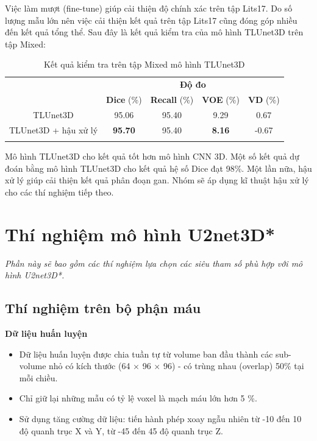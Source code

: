 Việc làm mượt (fine-tune) giúp cải thiện độ chính xác trên tập Lits17. Do số lượng mẫu lớn nên việc cải thiện kết quả trên tập Lits17 cũng đóng góp nhiều đến kết quả tổng thể. Sau đây là kết quả kiểm tra của mô hình TLUnet3D trên tập Mixed:

\begin{table}[H]
\renewcommand{\arraystretch}{1.1}
\centering
\begin{tabular}{c|c|c|c|c}
\Xhline{3\arrayrulewidth}
\multirow{2}{*}{\textbf{Thí nghiệm}} & \multicolumn{4}{c}{\textbf{Độ đo}}                             \\ \cline{2-5} 
                                     & \textbf{Dice} (\%) & \textbf{Recall} (\%) & \textbf{VOE} (\%) & \textbf{VD} (\%) \\ \hline
TLUnet3D                            & 95.06     & 95.40     & 9.29     & 0.67    \\ \hline
TLUnet3D + hậu xử lý             & \textbf{95.70}       & 95.40     & \textbf{8.16}   & -0.67       \\ 
\Xhline{3\arrayrulewidth}
\end{tabular}
\caption{Kết quả kiểm tra trên tập Mixed mô hình TLUnet3D}
\end{table}
\vspace{-5mm}

Mô hình TLUnet3D cho kết quả tốt hơn mô hình CNN 3D. Một số kết quả dự đoán bằng mô hình TLUnet3D cho kết quả hệ số Dice đạt 98\%. Một lần nữa, hậu xử lý giúp cải thiện kết quả phân đoạn gan. Nhóm sẽ áp dụng kĩ thuật hậu xử lý cho các thí nghiệm tiếp theo.

\newpage
\section{Thí nghiệm mô hình U2net3D*}
\textit{Phần này sẽ bao gồm các thí nghiệm lựa chọn các siêu tham số phù hợp với mô hình U2net3D*.}
\vspace{-0.1cm}
\subsection{Thí nghiệm trên bộ phận máu}
\noindent \textbf{Dữ liệu huấn luyện}
\begin{itemize}[itemsep=0pt, topsep=0pt]
    \item Dữ liệu huấn luyện được chia tuần tự từ volume ban đầu thành các sub-volume nhỏ có kích thước (64 $\times$ 96 $\times$ 96) - có trùng nhau (overlap) 50\% tại mỗi chiều.
    \item Chỉ giữ lại những mẫu có tỷ lệ voxel là mạch máu lớn hơn 5 \%.
    \item Sử dụng tăng cường dữ liệu: tiến hành phép xoay ngẫu nhiên từ -10 đến 10 độ quanh trục X và Y, từ -45 đến 45 độ quanh trục Z.
\end{itemize}

